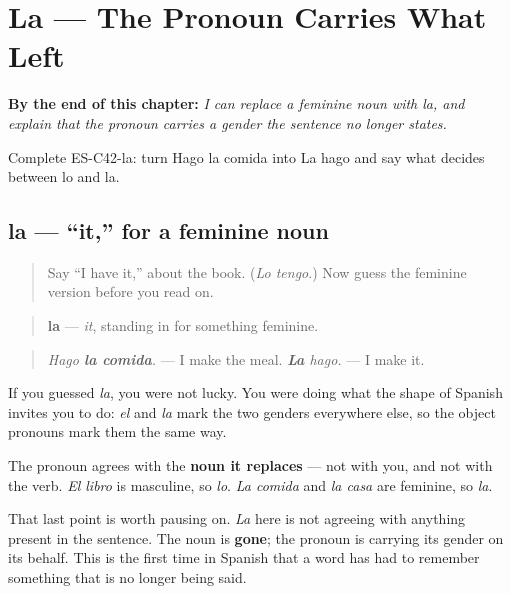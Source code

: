 
\chapter{La --- The Pronoun Carries What Left}
\label{ch:pronoun-la}

\begin{chapteropening}
\textbf{By the end of this chapter:} \emph{I can replace a feminine noun with la, and explain that the pronoun carries a gender the sentence no longer states.}

Complete ES-C42-la: turn Hago la comida into La hago and say what decides between lo and la.
\end{chapteropening}

\section[la]{la — \textquotedblleft{}it,\textquotedblright{} for a feminine noun}

\label{lesson:ES-C42-la}



\begin{quote}
Say \textquotedblleft{}I have it,\textquotedblright{} about the book. (\emph{Lo tengo}.) Now guess the feminine version before you read on.
\end{quote}

\begin{grammarlens}[title={Grammar Lens: the form you probably guessed}]
\begin{quote}
\textbf{la} — \emph{it}, standing in for something feminine.
\end{quote}

\begin{quote}
\emph{Hago \textbf{la comida}.} — I make the meal. \emph{\textbf{La} hago.} — I make it.
\end{quote}

If you guessed \emph{la}, you were not lucky. You were doing what the shape of Spanish invites you to do: \emph{el} and \emph{la} mark the two genders everywhere else, so the object pronouns mark them the same way.

The pronoun agrees with the \textbf{noun it replaces} — not with you, and not with the verb. \emph{El libro} is masculine, so \emph{lo}. \emph{La comida} and \emph{la casa} are feminine, so \emph{la}.

That last point is worth pausing on. \emph{La} here is not agreeing with anything present in the sentence. The noun is \textbf{gone}; the pronoun is carrying its gender on its behalf. This is the first time in Spanish that a word has had to remember something that is no longer being said.
\end{grammarlens}

